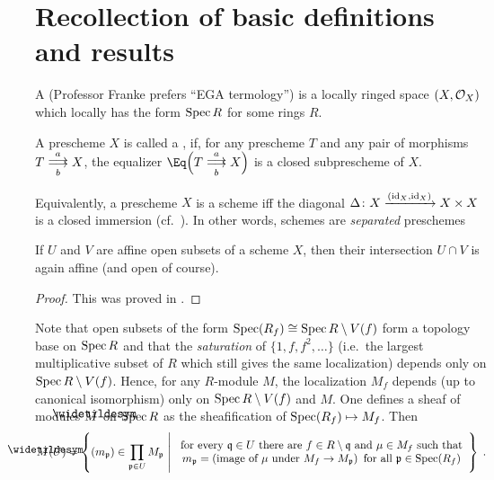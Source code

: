 \documentclass[a4paper,parskip=half,numbers=enddot, DIV=12]{scrreprt}
\begin{document}
\section{Recollection of basic definitions and results}
\begin{defi}
	\begin{alphanumerate}
		\item A  (Professor Franke prefers ``EGA termology'') is a locally ringed space $(X,\mathcal{O}_X)$ which locally has the form $\operatorname{Spec} R$ for some rings $R$.
		\item A prescheme $X$ is called a , if, for any prescheme $T$ and any pair of morphisms $T\doublemorphism[a][b]X$, the equalizer $\Eq\Big(T\doublemorphism[a][b]X\Big)$ is a closed subprescheme of $X$.
	\end{alphanumerate}
\end{defi}
\begin{rem*}
	Equivalently, a prescheme $X$ is a scheme iff the diagonal $\Delta\colon X\xrightarrow{(\operatorname{id}_X,\operatorname{id}_X)}X\times X$ is a closed immersion (cf.\ \cite[Fact~1.5.8]{alggeo1}). In other words, schemes are \emph{separated} preschemes
\end{rem*}
\begin{prop}
	If $U$ and $V$ are affine open subsets of a scheme $X$, then their intersection $U\cap V$ is again affine (and open of course).
\end{prop}
\begin{proof}
	This was proved in \cite[Proposition~1.5.4]{alggeo1}.
\end{proof}
	Note that open subsets of the form $\operatorname{Spec}(R_f)\cong \operatorname{Spec} R\setminus V(f)$ form a topology base on $\operatorname{Spec} R$ and that the \emph{saturation} of $\{1,f,f^2,\ldots\}$ (i.e.\ the largest multiplicative subset of $R$ which still gives the same localization) depends only on $\operatorname{Spec} R\setminus V(f)$. Hence, for any $R$-module $M$, the localization $M_f$ depends (up to canonical isomorphism) only on $\operatorname{Spec} R\setminus V(f)$ and $M$. One defines a sheaf of modules $\snake{M}$ on $\operatorname{Spec} R$ as the sheafification of $\operatorname{Spec} (R_f)\mapsto M_f$. Then
	\begin{align*}
		\snake{M}(U)=\left\{(m_\pp)\in\prod_{\pp\in U}M_\pp\st
		\begin{array}{c}
			\text{for every }\qq\in U\text{ there are }f\in R\setminus\qq\text{ and }\mu\in M_f\text{ such that}\\
			m_\pp=\left(\text{image of }\mu\text{ under }M_f\morphism M_\pp\right)\text{ for all }\pp\in\Spec (R_f)
		\end{array}
		\right\}\;.
	\end{align*}
\end{document}
